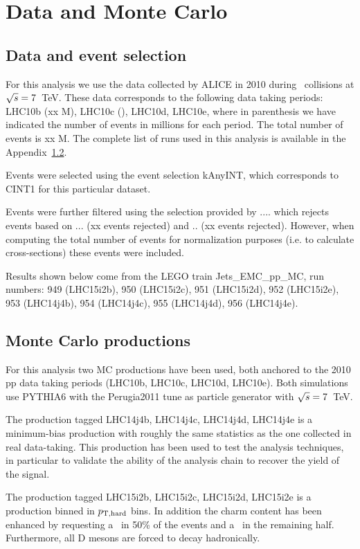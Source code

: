 \section{Data and Monte Carlo}

\subsection{Data and event selection}
For this analysis we use the data collected by ALICE in 2010 during \pp\ collisions at $\sqrt{s}=7$~TeV. These data corresponds to the following data taking periods:
LHC10b (xx M), LHC10c (), LHC10d, LHC10e, where in parenthesis we have indicated the number of events in millions for each period. The total number of events is xx M.
The complete list of runs used in this analysis is available in the Appendix~\ref{}.

Events were selected using the event selection kAnyINT, which corresponds to CINT1 for this particular dataset. 

Events were further filtered using the selection provided by .... which rejects events based on ... (xx events rejected) and .. (xx events rejected).
However, when computing the total number of events for normalization purposes (i.e. to calculate cross-sections) these events were included.

Results shown below come from the LEGO train Jets\_EMC\_pp\_MC, run numbers: 949 (LHC15i2b), 950 (LHC15i2c), 951 (LHC15i2d), 952 (LHC15i2e), 953 (LHC14j4b), 954 (LHC14j4c), 955 (LHC14j4d), 956 (LHC14j4e).

\subsection{Monte Carlo productions}
For this analysis two MC productions have been used, both anchored to the 2010 pp data taking periods (LHC10b, LHC10c, LHC10d, LHC10e).
Both simulations use PYTHIA6 with the Perugia2011 tune as particle generator with $\sqrt{s}=7$~TeV.

The production tagged LHC14j4b, LHC14j4c, LHC14j4d, LHC14j4e is a minimum-bias production with roughly the same statistics as the one collected in real data-taking.
This production has been used to test the analysis techniques, in particular to validate the ability of the analysis chain to recover the yield of the signal.

The production tagged LHC15i2b, LHC15i2c, LHC15i2d, LHC15i2e is a production binned in $p_{\rm T,hard}$ bins.
In addition the charm content has been enhanced by requesting a \ccbar\ in 50\% of the events and a \bbbar\ in the remaining half.
Furthermore, all D mesons are forced to decay hadronically.

